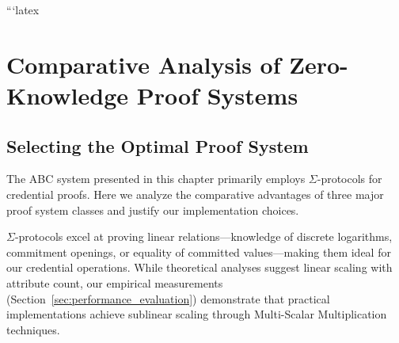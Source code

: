 ```latex
\section{Comparative Analysis of Zero-Knowledge Proof Systems}

\subsection{Selecting the Optimal Proof System}

The ABC system presented in this chapter primarily employs $\Sigma$-protocols for credential proofs. Here we analyze the comparative advantages of three major proof system classes and justify our implementation choices.

$\Sigma$-protocols excel at proving linear relations—knowledge of discrete logarithms, commitment openings, or equality of committed values—making them ideal for our credential operations. While theoretical analyses suggest linear scaling with attribute count, our empirical measurements (Section~\ref{sec:performance_evaluation}) demonstrate that practical implementations achieve sublinear scaling through Multi-Scalar Multiplication techniques.



